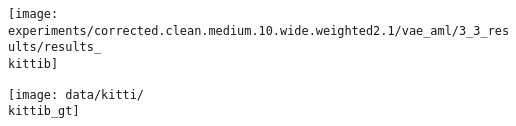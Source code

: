 {\begin{minipage}[t]{0.145\textwidth}
\end{minipage}
\begin{minipage}[t]{0.145\textwidth}
	\vspace{0px}\centering
	\texttt{[image: experiments/corrected.clean.medium.10.wide.weighted2.1/vae\_aml/3\_3\_results/results\_\\kittib]}
\end{minipage}
\begin{minipage}[t]{0.145\textwidth}
	\vspace{0px}\centering
	\texttt{[image: data/kitti/\\kittib\_gt]}
\end{minipage}
}

